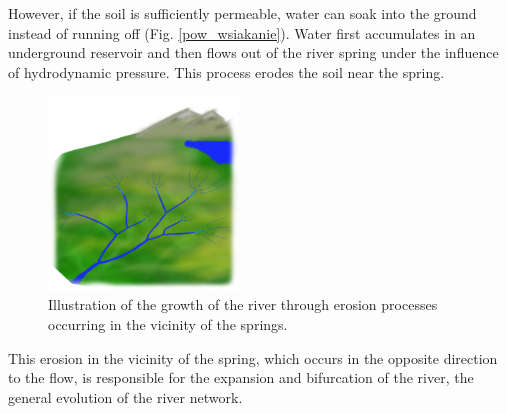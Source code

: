 \documentclass[]{pracamgr}
\begin{document}
    However, if the soil is sufficiently permeable, water can soak into the ground instead of running off (Fig. \ref{pow_wsiakanie}). Water first accumulates in an underground reservoir and then flows out of the river spring under the influence of hydrodynamic pressure. This process erodes the soil near the spring.

    \begin{figure}
      \begin{center}
        \vspace{-20pt}
        \includegraphics[width=0.45\textwidth]{figs/erosion_illustration.png}
      \end{center}
      \vspace{-20pt}
      \caption{Illustration of the growth of the river through erosion processes occurring in the vicinity of the springs.}
      \vspace{0pt}
      \label{zrodlo}
    \end{figure}

    This erosion in the vicinity of the spring, which occurs in the opposite direction to the flow, is responsible for the expansion and bifurcation of the river, the general evolution of the river network.
\end{document}
